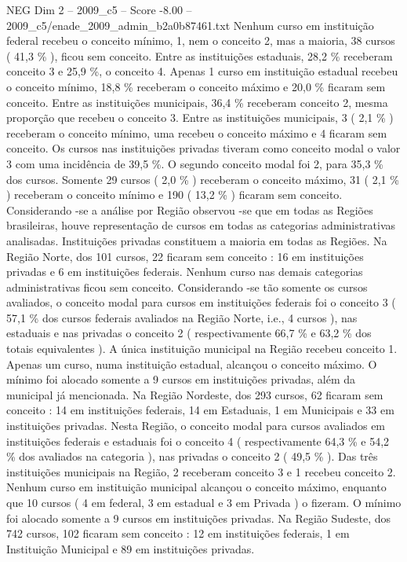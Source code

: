 \begin{textsample}{NEG Dim 2 – 2009\_c5 – Score -8.00 – 2009\_c5/enade\_2009\_admin\_b2a0b87461.txt}
Nenhum curso em instituição federal recebeu o conceito mínimo, 1, nem o conceito 2, mas a maioria, 38 cursos ( 41,3 \% ), ficou sem conceito.
Entre as instituições estaduais, 28,2 \% receberam conceito 3 e 25,9 \%, o conceito 4.
Apenas 1 curso em instituição estadual recebeu o conceito mínimo, 18,8 \% receberam o conceito máximo e 20,0 \% ficaram sem conceito.
Entre as instituições municipais, 36,4 \% receberam conceito 2, mesma proporção que recebeu o conceito 3.
Entre as instituições municipais, 3 ( 2,1 \% ) receberam o conceito mínimo, uma recebeu o conceito máximo e 4 ficaram sem conceito.
Os cursos nas instituições privadas tiveram como conceito modal o valor 3 com uma incidência de 39,5 \%.
O segundo conceito modal foi 2, para 35,3 \% dos cursos.
Somente 29 cursos ( 2,0 \% ) receberam o conceito máximo, 31 ( 2,1 \% ) receberam o conceito mínimo e 190 ( 13,2 \% ) ficaram sem conceito.
Considerando -se a análise por Região observou -se que em todas as Regiões brasileiras, houve representação de cursos em todas as categorias administrativas analisadas.
Instituições privadas constituem a maioria em todas as Regiões.
Na Região Norte, dos 101 cursos, 22 ficaram sem conceito : 16 em instituições privadas e 6 em instituições federais.
Nenhum curso nas demais categorias administrativas ficou sem conceito.
Considerando -se tão somente os cursos avaliados, o conceito modal para cursos em instituições federais foi o conceito 3 ( 57,1 \% dos cursos federais avaliados na Região Norte, i.e., 4 cursos ), nas estaduais e nas privadas o conceito 2 ( respectivamente 66,7 \% e 63,2 \% dos totais equivalentes ).
A única instituição municipal na Região recebeu conceito 1.
Apenas um curso, numa instituição estadual, alcançou o conceito máximo.
O mínimo foi alocado somente a 9 cursos em instituições privadas, além da municipal já mencionada.
Na Região Nordeste, dos 293 cursos, 62 ficaram sem conceito : 14 em instituições federais, 14 em Estaduais, 1 em Municipais e 33 em instituições privadas.
Nesta Região, o conceito modal para cursos avaliados em instituições federais e estaduais foi o conceito 4 ( respectivamente 64,3 \% e 54,2 \% dos avaliados na categoria ), nas privadas o conceito 2 ( 49,5 \% ).
Das três instituições municipais na Região, 2 receberam conceito 3 e 1 recebeu conceito 2.
Nenhum curso em instituição municipal alcançou o conceito máximo, enquanto que 10 cursos ( 4 em federal, 3 em estadual e 3 em Privada ) o fizeram.
O mínimo foi alocado somente a 9 cursos em instituições privadas.
Na Região Sudeste, dos 742 cursos, 102 ficaram sem conceito : 12 em instituições federais, 1 em Instituição Municipal e 89 em instituições privadas.

\end{textsample}
